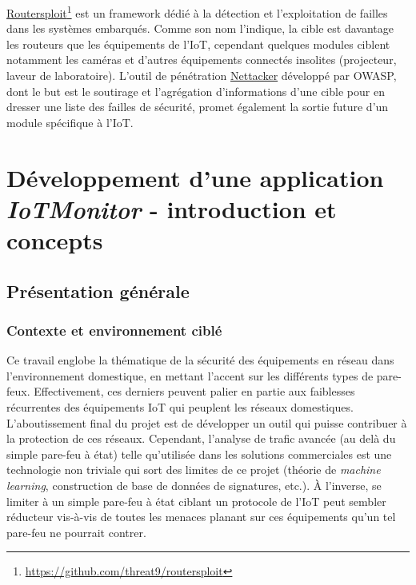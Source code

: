 \documentclass[]{article}
\begin{document}
\par \href{https://github.com/threat9/routersploit}{Routersploit}\footnote{\url{https://github.com/threat9/routersploit}} est un framework dédié à la détection et l'exploitation de failles dans les systèmes embarqués. Comme son nom l'indique, la cible est davantage les routeurs que les équipements de l'IoT, cependant quelques modules ciblent notamment les caméras et d'autres équipements connectés insolites (projecteur, laveur de laboratoire). L'outil de pénétration \href{https://github.com/zdresearch/OWASP-Nettacker}{Nettacker} développé par OWASP, dont le but est le soutirage et l'agrégation d'informations d'une cible pour en dresser une liste des failles de sécurité, promet également la sortie future d'un module spécifique à l'IoT.





\newpage

\section{Développement d'une application \textit{IoTMonitor} - introduction et concepts}
\subsection{Présentation générale}

\subsubsection{Contexte et environnement ciblé}

Ce travail englobe la thématique de la sécurité des équipements en réseau dans l'environnement domestique, en mettant l'accent sur les différents types de pare-feux. Effectivement, ces derniers peuvent palier en partie aux faiblesses récurrentes des équipements IoT qui peuplent les réseaux domestiques. L'aboutissement final du projet est de développer un outil qui puisse contribuer à la protection de ces réseaux. Cependant, l'analyse de trafic avancée (au delà du simple pare-feu à état) telle qu'utilisée dans les solutions commerciales est une technologie non triviale qui sort des limites de ce projet (théorie de \textit{machine learning}, construction de base de données de signatures, etc.). À l'inverse, se limiter à un simple pare-feu à état ciblant un protocole de l'IoT peut sembler réducteur vis-à-vis de toutes les menaces planant sur ces équipements qu'un tel pare-feu ne pourrait contrer.\\
\end{document}
